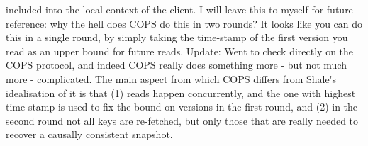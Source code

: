 included into the local context of the client.
\ac{I will leave this to myself for future reference: why the hell does COPS do this in two rounds? It looks like you can do 
this in a single round, by simply taking the time-stamp of the first version you read as an upper bound for future reads.
Update: Went to check directly on the COPS protocol, and indeed COPS really does something more - but not much more - complicated. 
The main aspect from which COPS differs from Shale's idealisation of it is that (1) reads happen concurrently, and the 
one with highest time-stamp is used to fix the bound on versions in the first round, and (2) in the second round not all keys 
are re-fetched, but only those that are really needed to recover a causally consistent snapshot.}



